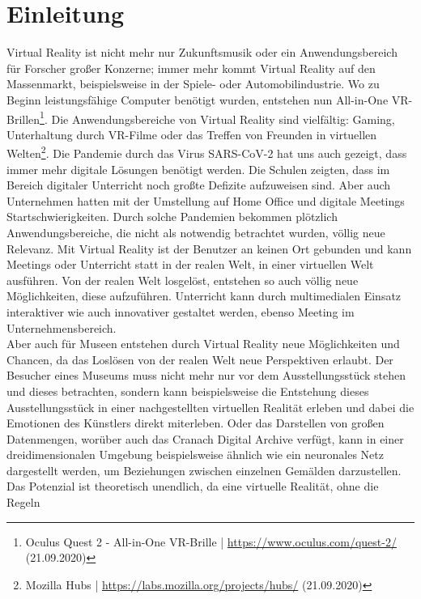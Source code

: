 \documentclass[a4paper,12pt,oneside]{article}
\begin{document}
  \section{Einleitung}
    Virtual Reality ist nicht mehr nur Zukunftsmusik oder ein Anwendungsbereich für Forscher
    großer Konzerne; immer mehr kommt Virtual Reality auf den Massenmarkt, beispielsweise
    in der Spiele- oder Automobilindustrie. Wo zu Beginn
    leistungsfähige Computer benötigt wurden, entstehen nun All-in-One VR-Brillen\footnote{Oculus Quest 2 - All-in-One VR-Brille | \url{https://www.oculus.com/quest-2/} (21.09.2020)}.
    Die Anwendungsbereiche von Virtual Reality sind vielfältig: Gaming, Unterhaltung durch VR-Filme oder
    das Treffen von Freunden in virtuellen Welten\footnote{Mozilla Hubs | \url{https://labs.mozilla.org/projects/hubs/} (21.09.2020)}.
    Die Pandemie durch das Virus SARS-CoV-2 hat uns auch gezeigt, dass immer mehr digitale Lösungen
    benötigt werden. Die Schulen zeigten, dass im Bereich digitaler Unterricht
    noch großte Defizite aufzuweisen sind. Aber auch Unternehmen hatten mit der Umstellung
    auf Home Office und digitale Meetings Startschwierigkeiten. 
    Durch solche Pandemien bekommen 
    plötzlich Anwendungsbereiche, die nicht als
    notwendig betrachtet wurden, völlig neue Relevanz.
    Mit Virtual Reality ist der Benutzer an keinen Ort gebunden und kann Meetings oder Unterricht
    statt in der realen Welt, in einer virtuellen Welt ausführen. Von der realen Welt
    losgelöst, entstehen so auch völlig neue Möglichkeiten, diese aufzuführen. Unterricht kann
    durch multimedialen Einsatz interaktiver wie auch innovativer gestaltet werden, ebenso
    Meeting im Unternehmensbereich. \\
    Aber auch für Museen entstehen durch Virtual Reality neue Möglichkeiten und Chancen,
    da das Loslösen von der realen Welt neue Perspektiven erlaubt. Der Besucher eines
    Museums muss nicht mehr nur vor dem Ausstellungsstück stehen und dieses betrachten,
    sondern kann beispielsweise die Entstehung dieses Ausstellungsstück in einer
    nachgestellten virtuellen Realität erleben und dabei die Emotionen des Künstlers
    direkt miterleben. Oder das Darstellen von großen Datenmengen, worüber auch das
    Cranach Digital Archive verfügt, kann in einer dreidimensionalen Umgebung beispielsweise
    ähnlich wie ein neuronales Netz dargestellt werden, um Beziehungen zwischen einzelnen
    Gemälden darzustellen. \\
    Das Potenzial ist theoretisch unendlich, da eine virtuelle Realität, ohne die Regeln
\end{document}
